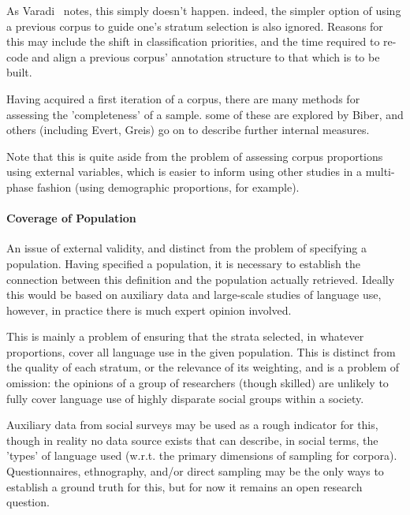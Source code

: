 As Varadi~\cite{varadi2000corpus}\cite{varadi2001linguistic} notes, this simply doesn't happen.  indeed, the simpler option of using a previous corpus to guide one's stratum selection is also ignored.  Reasons for this may include the shift in classification priorities, and the time required to re-code and align a previous corpus' annotation structure to that which is to be built. 

Having acquired a first iteration of a corpus, there are many methods for assessing the 'completeness' of a sample.  some of these are explored by Biber, and others (including Evert, Greis) go on to describe further internal measures\cite{evert2004simple}.

Note that this is quite aside from the problem of assessing corpus proportions using external variables, which is easier to inform using other studies in a multi-phase fashion (using demographic proportions, for example).



\paragraph{Coverage of Population}
An issue of external validity, and distinct from the problem of specifying a population.  Having specified a population, it is necessary to establish the connection between this definition and the population actually retrieved.  Ideally this would be based on auxiliary data and large-scale studies of language use, however, in practice there is much expert opinion involved.

This is mainly a problem of ensuring that the strata selected, in whatever proportions, cover all language use in the given population.  This is distinct from the quality of each stratum, or the relevance of its weighting, and is a problem of omission: the opinions of a group of researchers (though skilled) are unlikely to fully cover language use of highly disparate social groups within a society.

Auxiliary data from social surveys may be used as a rough indicator for this, though in reality no data source exists that can describe, in social terms, the 'types' of language used (w.r.t. the primary dimensions of sampling for corpora).  Questionnaires, ethnography, and/or direct sampling may be the only ways to establish a ground truth for this, but for now it remains an open research question.%





